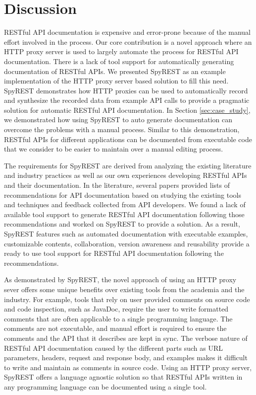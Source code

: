 \documentclass[conference]{IEEEtran}
\begin{document}
\section{Discussion}
RESTful API documentation is expensive and error-prone because of the manual effort involved in the process. Our core contribution is a novel approach where an HTTP proxy server is used to largely automate the process for RESTful API documentation. There is a lack of tool support for automatically generating documentation of RESTful APIs. We presented SpyREST as an example implementation of the HTTP proxy server based solution to fill this need. SpyREST demonstrates how HTTP proxies can be used to automatically record and synthesize the recorded data from example API calls to provide a pragmatic solution for automatic RESTful API documentation. In Section \ref{sec:case_study}, we demonstrated how using SpyREST to auto generate documentation can overcome the problems with a manual process. Similar to this demonstration, RESTful APIs for different applications can be documented from executable code that we consider to be easier to maintain over a manual editing process.

The requirements for SpyREST are derived from analyzing the existing literature and industry practices as well as our own experiences developing RESTful APIs and their documentation. In the literature, several papers provided lists of recommendations for API documentation based on studying the existing tools and techniques and feedback collected from API developers. We found a lack of available tool support to generate RESTful API documentation following those recommendations and worked on SpyREST to provide a solution. As a result, SpyREST features such as automated documentation with executable examples, customizable contents, collaboration, version awareness and reusability provide a ready to use tool support for RESTful API documentation following the recommendations.

As demonstrated by SpyREST, the novel approach of using an HTTP proxy sever offers some unique benefits over existing tools from the academia and the industry. For example, tools that rely on user provided comments on source code and code inspection, such as JavaDoc, require the user to write formatted comments that are often applicable to a single programming language. The comments are not executable, and manual effort is required to ensure the comments and the API that it describes are kept in sync. The verbose nature of RESTful API documentation caused by the different parts such as URL parameters, headers, request and response body, and examples makes it difficult to write and maintain as comments in source code. Using an HTTP proxy server, SpyREST offers a language agnostic solution so that RESTful APIs written in any programming language can be documented using a single tool.
\end{document}

